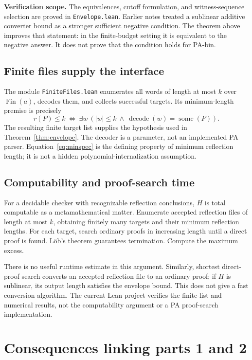 \documentclass[11pt]{article}
\theoremstyle{definition}
\theoremstyle{remark}
\newcommand{\status}[1]{\par\smallskip\noindent\textbf{Verification scope.} #1\par\smallskip}
\begin{document}
\status{The equivalences, cutoff formulation, and witness-sequence selection
are proved in \texttt{Envelope.lean}. Earlier notes treated a sublinear additive
converter bound as a stronger sufficient negative condition. The theorem
above improves that statement: in the finite-budget setting it is equivalent
to the negative answer. It does not prove that the condition holds for PA-bin.}

\subsection{Finite files supply the interface}
The module \texttt{FiniteFiles.lean} enumerates all words of length at most
$k$ over $\operatorname{Fin}(a)$, decodes them, and collects successful targets.
Its minimum-length premise is precisely
\begin{equation}\label{eq:minspec}
 r(P)\le k\ \Longleftrightarrow\
 \exists w\ (|w|\le k\ \wedge\ \operatorname{decode}(w)=\operatorname{some}(P)).
\end{equation}
The resulting finite target list supplies the hypothesis used in
Theorem~\ref{thm:envelope}. The decoder is a parameter, not an implemented PA
parser. Equation~\eqref{eq:minspec} is the defining property of minimum
reflection length; it is not a hidden polynomial-internalization assumption.

\subsection{Computability and proof-search time}
For a decidable checker with recognizable reflection conclusions, $H$ is
total computable as a metamathematical matter. Enumerate accepted reflection
files of length at most $k$, obtaining finitely many targets and their minimum
reflection lengths. For each target, search ordinary proofs in increasing
length until a direct proof is found. L\"ob's theorem guarantees termination.
Compute the maximum excess.

There is no useful runtime estimate in this argument. Similarly, shortest
direct-proof search converts an accepted reflection file to an ordinary proof;
if $H$ is sublinear, its output length satisfies the envelope bound. This does
not give a fast conversion algorithm. The current Lean project verifies the
finite-list and numerical results, not the computability argument or a PA
proof-search implementation.

\section{Consequences linking parts 1 and 2}
\label{sec:consequences}
\end{document}
